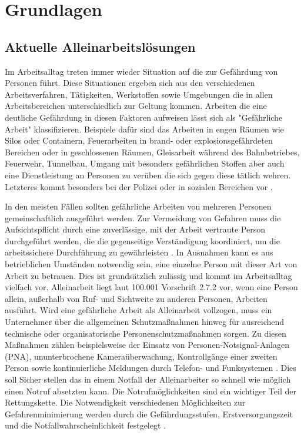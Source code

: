 \documentclass[thesis.tex]{subfiles}
\begin{document}
\chapter{Grundlagen}\label{chap:grundlagen}

\section{Aktuelle Alleinarbeitslösungen}

Im Arbeitsalltag treten immer wieder Situation auf die zur Gefährdung von Personen führt.
Diese Situationen ergeben sich aus den verschiedenen Arbeitsverfahren, Tätigkeiten, Werkstoffen sowie Umgebungen die in allen Arbeitsbereichen unterschiedlich zur Geltung kommen.
Arbeiten die eine deutliche Gefährdung in diesen Faktoren aufweisen lässt sich als "Gefährliche Arbeit" klassifizieren.
Beispiele dafür sind das Arbeiten in engen Räumen wie Silos oder Containern, Feuerarbeiten in brand- oder explosionsgefährdeten Bereichen oder in geschlossenen Räumen, Gleisarbeit während des Bahnbetriebes, Feuerwehr, Tunnelbau, Umgang mit besonders gefährlichen Stoffen aber auch eine Dienstleistung an Personen zu verüben die sich gegen diese tätlich wehren.
Letzteres kommt besonders bei der Polizei oder in sozialen Bereichen vor \cite[vgl. S.41 2.7.1]{Regel_100-001}.

In den meisten Fällen sollten gefährliche Arbeiten von mehreren Personen gemeinschaftlich ausgeführt werden.
Zur Vermeidung von Gefahren muss die Aufsichtspflicht durch eine zuverlässige, mit der Arbeit vertraute Person durchgeführt werden, die die gegenseitige Verständigung koordiniert, um die arbeitssichere Durchführung zu gewährleisten \cite[§8.1]{Vorschrift1_DGUV}.
In Ausnahmen kann es aus betrieblichen Umständen notwendig sein, eine einzelne Person mit dieser Art von Arbeit zu betrauen. Dies ist grundsätzlich zulässig und kommt im Arbeitsalltag vielfach vor.
Alleinarbeit liegt laut 100.001 Vorschrift 2.7.2 vor, wenn eine Person allein, außerhalb von Ruf- und Sichtweite zu anderen Personen, Arbeiten ausführt.
Wird eine gefährliche Arbeit als Alleinarbeit vollzogen, muss ein Unternehmer über die allgemeinen Schutzmaßnahmen hinweg für ausreichend technische oder organisatorische Personenschutzmaßnahmen sorgen.
Zu diesen Maßnahmen zählen beispielsweise der Einsatz von Personen-Notsignal-Anlagen (PNA), ununterbrochene Kameraüberwachung, Kontrollgänge einer zweiten Person sowie kontinuierliche Meldungen durch Telefon- und Funksystemen \cite[vgl. S.43 2.7.2]{Regel_100-001}.
Dies soll Sicher stellen das in einem Notfall der Alleinarbeiter so schnell wie möglich einen Notruf absetzten kann.
Die Notrufmöglichkeiten sind ein wichtiger Teil der Rettungskette.
Die Notwendigkeit verschiedenen Möglichkeiten zur Gefahrenminimierung werden durch die Gefährdungsstufen, Erstversorgungszeit und die Notfallwahrscheinlichkeit festgelegt \cite[vgl. S.13-18]{Regel_112-139}.
\end{document}
